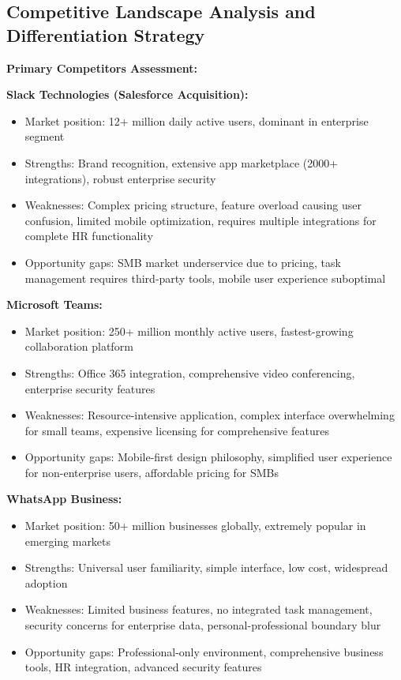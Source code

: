 \subsection{Competitive Landscape Analysis and Differentiation Strategy}

\textbf{Primary Competitors Assessment:}

\textbf{Slack Technologies (Salesforce Acquisition):}
\begin{itemize}
    \item Market position: 12+ million daily active users, dominant in enterprise segment
    \item Strengths: Brand recognition, extensive app marketplace (2000+ integrations), robust enterprise security
    \item Weaknesses: Complex pricing structure, feature overload causing user confusion, limited mobile optimization, requires multiple integrations for complete HR functionality
    \item Opportunity gaps: SMB market underservice due to pricing, task management requires third-party tools, mobile user experience suboptimal
\end{itemize}

\textbf{Microsoft Teams:}
\begin{itemize}
    \item Market position: 250+ million monthly active users, fastest-growing collaboration platform
    \item Strengths: Office 365 integration, comprehensive video conferencing, enterprise security features
    \item Weaknesses: Resource-intensive application, complex interface overwhelming for small teams, expensive licensing for comprehensive features
    \item Opportunity gaps: Mobile-first design philosophy, simplified user experience for non-enterprise users, affordable pricing for SMBs
\end{itemize}

\textbf{WhatsApp Business:}
\begin{itemize}
    \item Market position: 50+ million businesses globally, extremely popular in emerging markets
    \item Strengths: Universal user familiarity, simple interface, low cost, widespread adoption
    \item Weaknesses: Limited business features, no integrated task management, security concerns for enterprise data, personal-professional boundary blur
    \item Opportunity gaps: Professional-only environment, comprehensive business tools, HR integration, advanced security features
\end{itemize}

